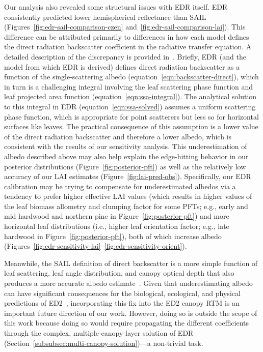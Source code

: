 Our analysis also revealed some structural issues with EDR itself.
EDR consistently predicted lower hemispherical reflectance than SAIL (Figures~\ref{fig:edr-sail-comparison-czen} and~\ref{fig:edr-sail-comparison-lai}).
This difference can be attributed primarily to differences in how each model defines the direct radiation backscatter coefficient in the radiative transfer equation.
A detailed description of the discrepancy is provided in~\citet{yuan2017reexamination}.
Briefly, EDR (and the \citealt{sellers1985canopy} model from which EDR is derived) defines direct radiation backscatter as a function of the single-scattering albedo (equation~\ref{eqn:backscatter-direct}),
which in turn is a challenging integral involving the leaf scattering phase function and leaf projected area function (equation~\ref{eqn:ssa-integral}).
The analytical solution to this integral in EDR (equation~\ref{eqn:ssa-solved}) assumes a uniform scattering phase function, which is appropriate for point scatterers but less so for horizontal surfaces like leaves.
The practical consequence of this assumption is a lower value of the direct radiation backscatter and therefore a lower albedo, which is consistent with the results of our sensitivity analysis.
This underestimation of albedo described above may also help explain the edge-hitting behavior in our posterior distributions (Figure~\ref{fig:posterior-pft}) as well as the relatively low accuracy of our LAI estimates (Figure~\ref{fig:lai-pred-obs}).
Specifically, our EDR calibration may be trying to compensate for underestimated albedos via a tendency to prefer
higher effective LAI values (which results in higher values of the leaf biomass allometry and clumping factor for some PFTs; e.g., early and mid hardwood and northern pine in Figure~\ref{fig:posterior-pft}) and
more horizontal leaf distributions (i.e., higher leaf orientation factor; e.g., late hardwood in Figure~\ref{fig:posterior-pft}), both of which increase albedo (Figures~\ref{fig:edr-sensitivity-lai}--\ref{fig:edr-sensitivity-orient}).

Meanwhile, the SAIL definition of direct backscatter is a more simple function of leaf scattering, leaf angle distribution, and canopy optical depth that also produces a more accurate albedo estimate~\citep{yuan2017reexamination}.
Given that underestimating albedo can have significant consequences for the biological, ecological, and physical predictions of ED2~\citep{viskari_2019_influence}, incorporating this fix into the ED2 canopy RTM is an important future direction of our work.
However, doing so is outside the scope of this work because doing so would require propagating the different coefficients through the complex, multiple-canopy-layer solution of EDR (Section~\ref{subsubsec:multi-canopy-solution})---a non-trivial task.

